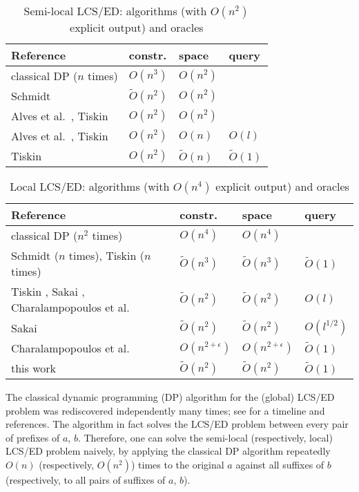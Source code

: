 \documentclass[a4paper,UKenglish,cleveref]{lipics-v2021}
\begin{document}
\begin{table}\centering
\begin{tabular}{|l|l|l|l|}\hline
%
Reference & constr. & space & query \\ \hline
%
classical DP ($n$ times) & $O(n^3)$ & $O(n^2)$ & \\
%
Schmidt \cite{Schmidt:98}  & $\tilde O(n^2)$ & $O(n^2)$ & \\
%
Alves et al.\ \cite{Alves+:08}, Tiskin \cite{Tiskin:06_CSR} & $O(n^2)$ & $O(n^2)$ & \\ \hline
%
Alves et al.\ \cite{Alves+:08}, Tiskin \cite{Tiskin:06_CSR} & $O(n^2)$ & $O(n)$ & $O(l)$ \\
%
Tiskin \cite{Tiskin:06_CSR} & $O(n^2)$ & $\tilde O(n)$ & $\tilde O(1)$ \\ \hline
%
\end{tabular}
%
\caption{\label{t-slcs}Semi-local LCS/ED: algorithms (with $O(n^2)$ explicit output) and oracles}
%
\end{table}

\begin{table}\centering
\begin{tabular}{|l|l|l|l|}\hline
%
Reference & constr. & space & query \\ \hline
%
classical DP ($n^2$ times) & $O(n^4)$ & $O(n^4)$ & \\ \hline
%
Schmidt \cite{Schmidt:98} ($n$ times), Tiskin \cite{Tiskin:06_CSR} ($n$ times) & 
$\tilde O(n^3)$ & $\tilde O(n^3)$ & $\tilde O(1)$ \\
%
Tiskin \cite{Tiskin:08}, Sakai \cite{Sakai:19}, Charalampopoulos et al.\ \cite{Charalampopoulos+:20} & 
$\tilde O(n^2)$ & $\tilde O(n^2)$ & $O(l)$ \\
%
Sakai \cite{Sakai:22} & $\tilde O(n^2)$ & $\tilde O(n^2)$ & $O(l^{1/2})$ \\
%
Charalampopoulos et al.\ \cite{Charalampopoulos+:21} & 
$O(n^{2+\epsilon})$ & $O(n^{2+\epsilon})$ & $\tilde O(1)$ \\
%
this work & $\tilde O(n^2)$ & $\tilde O(n^2)$ & $\tilde O(1)$ \\ \hline
%
\end{tabular}
%
\caption{\label{t-llcs}Local LCS/ED: algorithms (with $O(n^4)$ explicit output) and oracles}
%
\end{table}

The classical dynamic programming (DP) algorithm for the (global) LCS/ED problem
was rediscovered independently many times; see \cite{jeffe} for a timeline and references.
The algorithm in fact solves the LCS/ED problem between every pair of prefixes of $a$, $b$.
Therefore, one can solve the semi-local (respectively, local) LCS/ED problem naively,
by applying the classical DP algorithm repeatedly $O(n)$ (respectively, $O(n^2)$) times
to the original $a$ against all suffixes of $b$ 
(respectively, to all pairs of suffixes of $a$, $b$).
\end{document}
